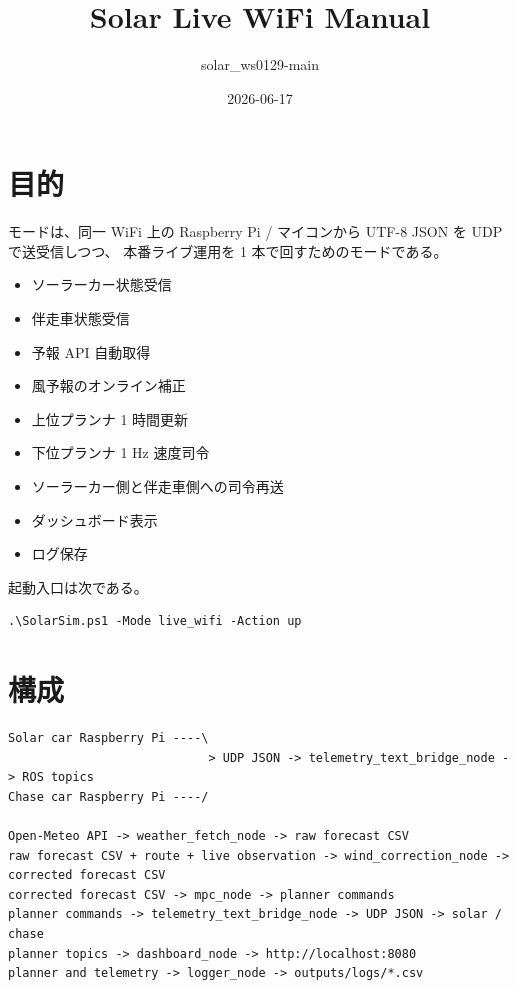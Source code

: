 \documentclass[a4paper,11pt]{article}
\title{Solar Live WiFi Manual}
\author{solar\_ws0129-main}
\date{2026-06-17}
\begin{document}
\maketitle

\section{目的}

 モードは、同一 WiFi 上の Raspberry Pi / マイコンから UTF-8 JSON を UDP で送受信しつつ、
本番ライブ運用を 1 本で回すためのモードである。

\begin{itemize}
  \item ソーラーカー状態受信
  \item 伴走車状態受信
  \item 予報 API 自動取得
  \item 風予報のオンライン補正
  \item 上位プランナ 1 時間更新
  \item 下位プランナ 1 Hz 速度司令
  \item ソーラーカー側と伴走車側への司令再送
  \item ダッシュボード表示
  \item ログ保存
\end{itemize}

起動入口は次である。

\begin{Verbatim}[fontsize=\small]
.\SolarSim.ps1 -Mode live_wifi -Action up
\end{Verbatim}

\section{構成}

\begin{Verbatim}[fontsize=\small]
Solar car Raspberry Pi ----\
                            > UDP JSON -> telemetry_text_bridge_node -> ROS topics
Chase car Raspberry Pi ----/

Open-Meteo API -> weather_fetch_node -> raw forecast CSV
raw forecast CSV + route + live observation -> wind_correction_node -> corrected forecast CSV
corrected forecast CSV -> mpc_node -> planner commands
planner commands -> telemetry_text_bridge_node -> UDP JSON -> solar / chase
planner topics -> dashboard_node -> http://localhost:8080
planner and telemetry -> logger_node -> outputs/logs/*.csv
\end{Verbatim}
\end{document}
